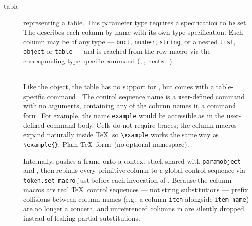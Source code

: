 \documentclass{ltxdoc}
\newcommand\showexample[5][15pt]{%
\begin{minipage}[t]{.5\linewidth - .5 \columnsep}%

\end{minipage}\hspace*{\columnsep}%
\begin{minipage}[t]{.5\linewidth - .5 \columnsep}%

\end{minipage}\\%
}
\begin{document}
\begin{description}
        \item[table] representing a table.
        This parameter type requires a  specification to be set.
        The  describes each column by name with its own type specification.
        Each column may be of any type --- \texttt{bool}, \texttt{number}, \texttt{string}, or a nested \texttt{list}, \texttt{object} or \texttt{table} --- and is reached from the row macro via the corresponding type-specific command (\cmd{\paramfield}, \cmd{\forlistitem}, nested \cmd{\fortablerow}).\\
        \showexample[20pt]{31}{31-39}{12}{12-16}
        \DescribeMacro{\fortablerow}
        Like the object, the table has no support for \cmd{\param}, but comes with a table-specific command \cmd{\fortablerow}.
        The control sequence name  is a user-defined command with no arguments, containing any of the column names in a command form.
        For example, the name \texttt{example} would be accessible as \cmd{\example} in the user-defined command body.
        Cells do not require braces; the column macros expand naturally inside \TeX, so \texttt{\textbackslash example} works the same way as \texttt{\textbackslash example\{\}}.
        Plain \TeX\ form: \cmd{\fortablerow} (no optional namespace).

        Internally, \cmd{\fortablerow} pushes a frame onto a context stack shared with \texttt{paramobject} and \cmd{\forlistitem}, then rebinds every primitive column to a global control sequence via \texttt{token.set\_macro} just before each invocation of .
        Because the column macros are real \TeX\ control sequences --- not string substitutions --- prefix collisions between column names (e.g.\ a column \texttt{item} alongside \texttt{item\_name}) are no longer a concern, and unreferenced columns in  are silently dropped instead of leaking partial substitutions.


\end{description}
\end{document}
